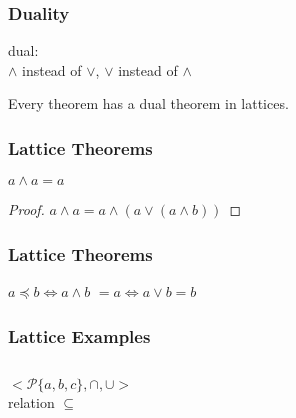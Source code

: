 \documentclass[dvipsnames]{beamer}
\begin{document}
\begin{frame}
  \frametitle{Duality}

  \begin{definition}
    \alert{dual}:\\
    $\wedge$ instead of $\vee$, $\vee$ instead of $\wedge$
  \end{definition}

  \pause
  \begin{theorem}
    Every theorem has a dual theorem in lattices.
  \end{theorem}
\end{frame}

\begin{frame}
  \frametitle{Lattice Theorems}

  \begin{theorem}
    $a \wedge a = a$
  \end{theorem}

  \pause
  \begin{proof}
    $a \wedge a = a \wedge (a \vee (a \wedge b))$
  \end{proof}
\end{frame}

\begin{frame}
  \frametitle{Lattice Theorems}

  \begin{theorem}
    $a \preceq b \Leftrightarrow a \wedge b$
    $ = a \Leftrightarrow a \vee b = b$
  \end{theorem}
\end{frame}

\begin{frame}
  \frametitle{Lattice Examples}

  \begin{example}
    \begin{columns}
      \[
	<\mathcal{P}\{a,b,c\},\cap,\cup>
      \]
      relation $\subseteq$

      \begin{center}
      \end{center}
    \end{columns}
  \end{example}
\end{frame}
\end{document}
